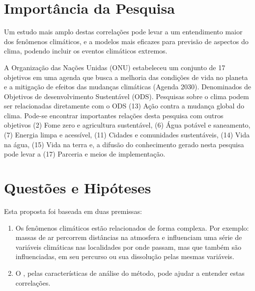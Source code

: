 \section{Importância da Pesquisa}
\label{sec:justificativa}

Um estudo mais amplo destas correlações pode levar a um entendimento maior dos fenômenos climáticos, e a modelos mais eficazes para previsão de aspectos do clima, podendo incluir os eventos climáticos extremos. 

A Organização das Nações Unidas (ONU) estabeleceu um conjunto de 17 objetivos em uma agenda que busca a melhoria das condições de vida no planeta e a mitigação de efeitos das mudanças climáticas (Agenda 2030). Denominados de Objetivos de desenvolvimento Sustentável (ODS). Pesquisas sobre o clima podem ser relacionadas diretamente com o ODS (13) Ação contra a mudança global do clima. Pode-se  encontrar importantes relações desta pesquisa com outros objetivos (2) Fome zero e agricultura sustentável, (6) Água potável e saneamento, (7) Energia limpa e acessível, (11) Cidades e comunidades sustentáveis, (14) Vida na água, (15) Vida na terra e, a difusão do conhecimento gerado nesta pesquisa pode levar a (17) Parceria e meios de implementação.




\section{Questões e Hipóteses}
\label{sec:questoes}

Esta proposta foi baseada em duas premissas:

\begin{enumerate}
    \label{enum:premissas}
    \item Os fenômenos climáticos estão relacionados de forma complexa. Por exemplo: massas de ar percorrem distâncias na atmosfera e influenciam uma série de variáveis climáticas nas localidades por onde passam, mas que também são influenciadas, em seu percurso ou sua dissolução pelas mesmas variáveis.
    \item O \dmc, pelas características de análise do método, pode ajudar a entender estas correlações.
\end{enumerate}

